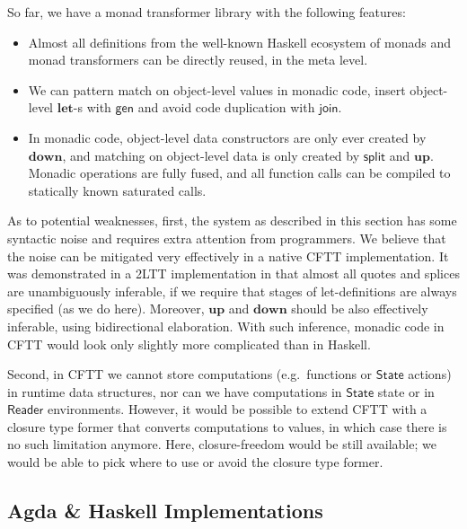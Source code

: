 \documentclass[acmsmall,screen,review,anonymous]{acmart}
\newcommand{\mit}[1]{{\mathsf{#1}}}
\newcommand{\msf}[1]{{\mathsf{#1}}}
\newcommand{\mbf}[1]{{\mathbf{#1}}}
\newcommand{\Reader}{\msf{Reader}}
\theoremstyle{remark}
\newcommand{\mup}{\mbf{up}}
\newcommand{\mdown}{\mbf{down}}
\newcommand{\gen}{\mit{gen}}
\newcommand{\State}{\msf{State}}
\newcommand{\join}{\mit{join}}
\begin{document}
So far, we have a monad transformer library with the following features:
\begin{itemize}
\item Almost all definitions from the well-known Haskell ecosystem of monads and monad transformers
      can be directly reused, in the meta level.
\item We can pattern match on object-level values in monadic code, insert object-level $\mbf{let}$-s
      with $\gen$ and avoid code duplication with $\join$.
\item In monadic code, object-level data constructors are only ever created by
      $\mdown$, and matching on object-level data is only created by $\mit{split}$
      and $\mup$. Monadic operations are fully fused, and all function calls can be
      compiled to statically known saturated calls.
\end{itemize}

As to potential weaknesses, first, the system as described in this section has
some syntactic noise and requires extra attention from programmers.  We believe
that the noise can be mitigated very effectively in a native CFTT
implementation. It was demonstrated in a 2LTT implementation in
\cite{staged-demo} that almost all quotes and splices are unambiguously
inferable, if we require that stages of let-definitions are always specified (as
we do here). Moreover, $\mup$ and $\mdown$ should be also effectively inferable,
using bidirectional elaboration. With such inference, monadic code in CFTT would
look only slightly more complicated than in Haskell.

Second, in CFTT we cannot store computations (e.g.\ functions or $\State$
actions) in runtime data structures, nor can we have computations in $\State$
state or in $\Reader$ environments. However, it would be possible to extend CFTT
with a closure type former that converts computations to values, in which case
there is no such limitation anymore. Here, closure-freedom would be still
available; we would be able to pick where to use or avoid the closure type
former.

\subsection{Agda \& Haskell Implementations}
\end{document}
